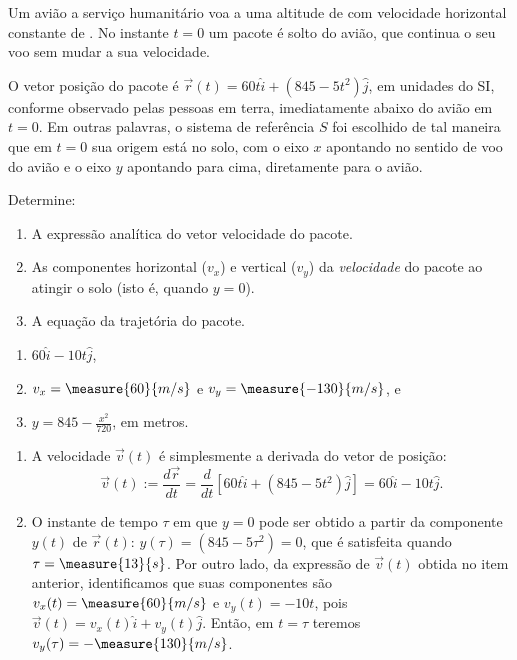 \begin{question}
		Um avião a serviço humanitário voa a uma altitude de  com velocidade horizontal constante de .
		No instante $t = 0$ um pacote é solto do avião, que continua o seu voo sem mudar a sua velocidade.

		O vetor posição do pacote é $\vec r(t) = 60 t\hat i + (845 - 5t^2)\hat j$, em unidades do SI, conforme observado pelas pessoas em terra, imediatamente abaixo do avião em $t = 0$.
		Em outras palavras, o sistema de referência $S$ foi escolhido de tal maneira que em $t = 0$ sua origem está no solo, com o eixo $x$ apontando no sentido de voo do avião e o eixo $y$ apontando para cima, diretamente para o avião.

		Determine:

		\begin{enumerate}
			\item A expressão analítica do vetor velocidade do pacote.
			\item As componentes horizontal ($v_x$) e vertical ($v_y$) da \emph{velocidade} do pacote ao atingir o solo (isto é, quando $y = 0$).
			\item A equação da trajetória do pacote.
		\end{enumerate}

		\begin{answer}
			\begin{enumerate}
				\item $60\hat i - 10t \hat j$,
				\item $v_x = \measure{60}{m/s}$ e $v_y = \measure{-130}{m/s}$, e
				\item $y = 845 - \frac{x^2}{720}$, em metros.
			\end{enumerate}
		\end{answer}

		\begin{solution}
			\begin{enumerate}
				\item A velocidade $\vec v(t)$ é simplesmente a derivada do vetor de posição:
				\begin{equation*}
					\vec v(t) := \frac{d\vec r}{dt} = \frac{d}{dt}\left[60 t\hat i + (845 - 5t^2)\hat j\right] = 60\hat i - 10t \hat j.
				\end{equation*}

				\item O instante de tempo $\tau$ em que $y = 0$ pode ser obtido a partir da componente $y(t)$ de $\vec r(t)$: $y(\tau) = (845 - 5\tau^2) = 0$, que é satisfeita quando $\tau = \measure{13}{s}$.
				Por outro lado, da expressão de $\vec v(t)$ obtida no item anterior, identificamos que suas componentes são $v_x(t) = \measure{60}{m/s}$ e $v_y(t) = -10t$, pois $\vec v(t) = v_x(t)\hat i + v_y(t)\hat j$.
				Então, em $t = \tau$ teremos $v_y(\tau) = -\measure{130}{m/s}$.


\end{enumerate}
\end{solution}
\end{question}
